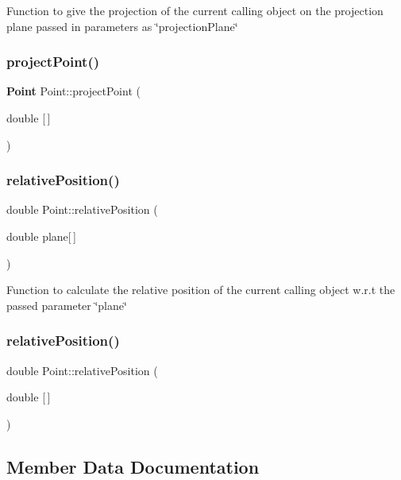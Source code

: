 Function to give the projection of the current calling object on the projection plane passed in parameters as \char`\"{}projection\+Plane\char`\"{}\mbox{\label{class_point_a209c076529495ad94cf65b8a71d29913}} 
\subsubsection{project\+Point()\hspace{0.1cm}{\footnotesize\ttfamily [2/2]}}
{\footnotesize\ttfamily \textbf{ Point} Point\+::project\+Point (\begin{DoxyParamCaption}\item[{double}]{[$\,$] }\end{DoxyParamCaption})}

\mbox{\label{class_point_a700201e1da138be7e3225b9d2bff50e9}} 
\subsubsection{relative\+Position()\hspace{0.1cm}{\footnotesize\ttfamily [1/2]}}
{\footnotesize\ttfamily double Point\+::relative\+Position (\begin{DoxyParamCaption}\item[{double}]{plane[$\,$] }\end{DoxyParamCaption})}

Function to calculate the relative position of the current calling object w.\+r.\+t the passed parameter \char`\"{}plane\char`\"{}\mbox{\label{class_point_a700201e1da138be7e3225b9d2bff50e9}} 
\subsubsection{relative\+Position()\hspace{0.1cm}{\footnotesize\ttfamily [2/2]}}
{\footnotesize\ttfamily double Point\+::relative\+Position (\begin{DoxyParamCaption}\item[{double}]{[$\,$] }\end{DoxyParamCaption})}



\subsection{Member Data Documentation}
\mbox{\label{class_point_ab99c56589bc8ad5fa5071387110a5bc7}} 
